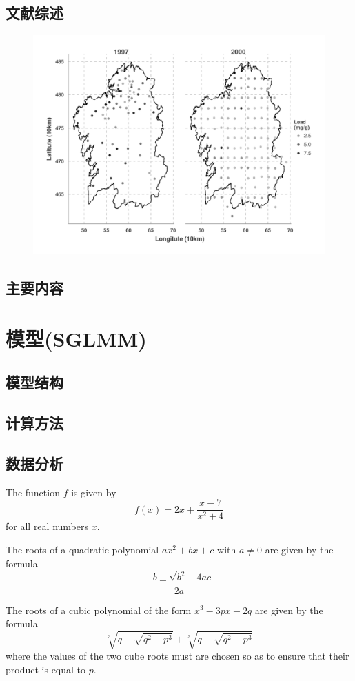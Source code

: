 \documentclass[10pt,aspectratio=43,compress,xcolor=x11names,UTF8]{beamer}
\begin{document}
\subsection{文献综述}

\begin{frame}
\begin{figure}
\centering
\includegraphics[width=.8\textwidth]{demo04}  
\end{figure}
\end{frame}

\subsection{主要内容}


\section{模型(SGLMM)}

\subsection{模型结构}

\subsection{计算方法}

\subsection{数据分析}

\begin{frame}

The function $f$ is given by
\[ f(x) = 2x + \frac{x - 7}{x^2 + 4}\] 
for all real numbers $x$.

The roots of a quadratic polynomial $a x^2 + bx + c$ with
$a \neq 0$ are given by the formula
\[ \frac{-b \pm \sqrt{b^2 - 4ac}}{2a} \]

The roots of a cubic polynomial of the form $x^3 - 3px - 2q$
are given by the formula
\[ \sqrt[3]{q + \sqrt{ q^2 - p^3 }}
  + \sqrt[3]{q - \sqrt{ q^2 - p^3 }} \]
where the values of the two cube roots must are chosen
so as to ensure that their product is equal to $p$.
\end{frame}
\end{document}
